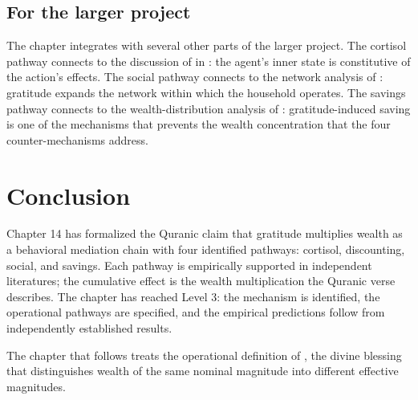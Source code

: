 \subsection{For the larger project}

The chapter integrates with several other parts of the larger
project. The cortisol pathway connects to the discussion of
 in : the agent's inner
state is constitutive of the action's effects. The social pathway
connects to the network analysis of :
gratitude expands the network within which the household operates.
The savings pathway connects to the wealth-distribution analysis
of : gratitude-induced saving is one of the
mechanisms that prevents the wealth concentration that the four
counter-mechanisms address.

\section{Conclusion}

Chapter 14 has formalized the Quranic claim that gratitude
multiplies wealth as a behavioral mediation chain with four
identified pathways: cortisol, discounting, social, and savings.
Each pathway is empirically supported in independent literatures;
the cumulative effect is the wealth multiplication the Quranic
verse describes. The chapter has reached Level 3: the mechanism
is identified, the operational pathways are specified, and the
empirical predictions follow from independently established
results.

The chapter that follows treats the operational definition of
, the divine blessing that distinguishes wealth of
the same nominal magnitude into different effective magnitudes.

